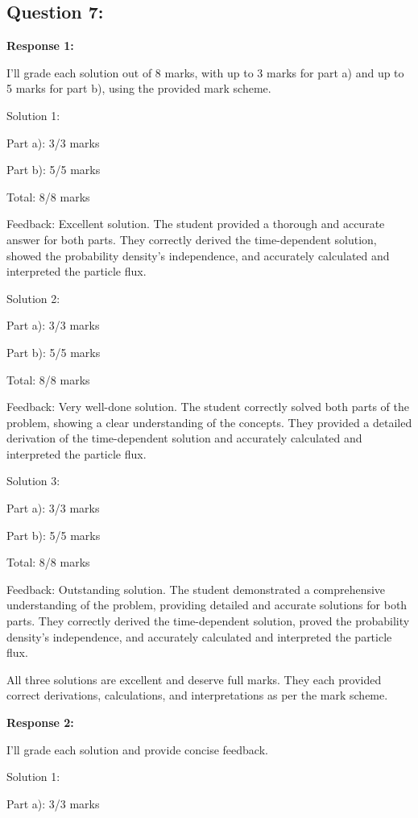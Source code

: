 \documentclass[a4paper,11pt]{article}
\begin{document}
\subsection*{Question 7:}

\textbf{Response 1:}

I'll grade each solution out of 8 marks, with up to 3 marks for part a) and up to 5 marks for part b), using the provided mark scheme.

Solution 1:

Part a): 3/3 marks

Part b): 5/5 marks

Total: 8/8 marks

Feedback: Excellent solution. The student provided a thorough and accurate answer for both parts. They correctly derived the time-dependent solution, showed the probability density's independence, and accurately calculated and interpreted the particle flux.

Solution 2:

Part a): 3/3 marks

Part b): 5/5 marks

Total: 8/8 marks

Feedback: Very well-done solution. The student correctly solved both parts of the problem, showing a clear understanding of the concepts. They provided a detailed derivation of the time-dependent solution and accurately calculated and interpreted the particle flux.

Solution 3:

Part a): 3/3 marks

Part b): 5/5 marks

Total: 8/8 marks

Feedback: Outstanding solution. The student demonstrated a comprehensive understanding of the problem, providing detailed and accurate solutions for both parts. They correctly derived the time-dependent solution, proved the probability density's independence, and accurately calculated and interpreted the particle flux.

All three solutions are excellent and deserve full marks. They each provided correct derivations, calculations, and interpretations as per the mark scheme.

\bigskip   
\textbf{Response 2:}

I'll grade each solution and provide concise feedback.

Solution 1:

Part a): 3/3 marks
\end{document}
